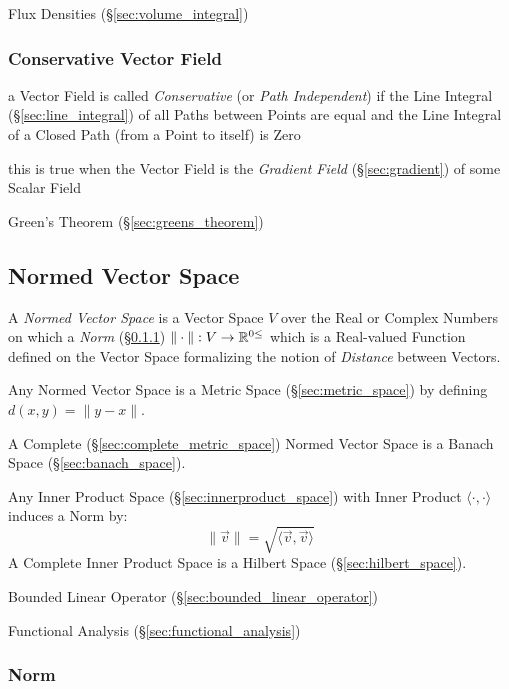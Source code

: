 Flux Densities \fist (\S\ref{sec:volume_integral})



\subsubsection{Conservative Vector Field}\label{sec:conservative_vector_field}

a Vector Field is called \emph{Conservative} (or \emph{Path Independent}) if
the Line Integral (\S\ref{sec:line_integral}) of all Paths between Points are
equal and the Line Integral of a Closed Path (from a Point to itself) is Zero

this is true when the Vector Field is the \emph{Gradient Field}
(\S\ref{sec:gradient}) of some Scalar Field

\fist Green's Theorem (\S\ref{sec:greens_theorem})



\subsection{Normed Vector Space}\label{sec:normed_vectorspace}

A \emph{Normed Vector Space} is a Vector Space $V$ over the Real or Complex
Numbers on which a \emph{Norm} (\S\ref{sec:norm}) $\|\cdot\| : V \rightarrow
\mathbb{R}^{0\leq}$ which is a Real-valued Function defined on the Vector Space
formalizing the notion of \emph{Distance} between Vectors.

Any Normed Vector Space is a Metric Space (\S\ref{sec:metric_space}) by
defining $d(x,y) = \|y-x\|$.

A Complete (\S\ref{sec:complete_metric_space}) Normed Vector Space is a Banach
Space (\S\ref{sec:banach_space}).

Any Inner Product Space (\S\ref{sec:innerproduct_space}) with Inner Product
$\langle{\cdot,\cdot}\rangle$ induces a Norm by:
\[
  \|\vec{v}\| = \sqrt{\langle{\vec{v},\vec{v}}\rangle}
\]
A Complete Inner Product Space is a Hilbert Space (\S\ref{sec:hilbert_space}).

Bounded Linear Operator (\S\ref{sec:bounded_linear_operator})

Functional Analysis (\S\ref{sec:functional_analysis})



\subsubsection{Norm}\label{sec:norm}

